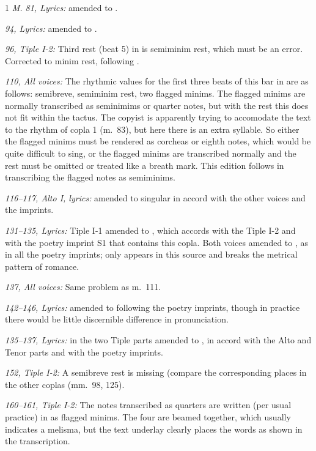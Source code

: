 \bigskip
\begin{hangparas}{\myparindent}{1}
%
\emph{M. 81, Lyrics: }
 amended to .
 
\emph{94, Lyrics: }
 amended to .

\emph{96, Tiple I-2: } 
Third rest (beat 5) in  is semiminim rest, which must be an error. 
Corrected to minim rest, following .

\emph{110, All voices: }
The rhythmic values for the first three beats of this bar in  are as follows: semibreve, semiminim rest, two flagged minims. 
The flagged minims are normally transcribed as seminimims or quarter notes, but with the rest this does not fit within the tactus. 
The copyist is apparently trying to accomodate the text to the rhythm of copla 1 (m.~83), but here there is an extra syllable. 
So either the flagged minims must be rendered as corcheas or eighth notes, which would be quite difficult to sing, or the flagged minims are transcribed normally and the rest must be omitted or treated like a breath mark. 
This edition follows  in transcribing the flagged notes as semiminims.

\emph{116--117, Alto I, lyrics: }
 amended to singular in accord with the other voices and the imprints.

\emph{131--135, Lyrics: }
Tiple I-1  amended to , which accords with the Tiple I-2 and with the poetry imprint S1 that contains this copla.
Both voices  amended to , as in all the poetry imprints;  only appears in this source and breaks the metrical pattern of romance.

\emph{137, All voices: }
Same problem as m.~111.

\emph{142--146, Lyrics: }
 amended to  following the poetry imprints, though in practice there would be little discernible difference in pronunciation.

\emph{135--137, Lyrics: } 
 in the two Tiple parts amended to , in accord with the Alto and Tenor parts and with the poetry imprints.

\emph{152, Tiple I-2: }
A semibreve rest is missing (compare the corresponding places in the other coplas (mm.~98, 125).

\emph{160--161, Tiple I-2: }
The notes transcribed as quarters are written (per usual practice) in  as flagged minims. 
The four are beamed together, which usually indicates a melisma, but the text underlay clearly places the words as shown in the transcription.
%
\end{hangparas}

